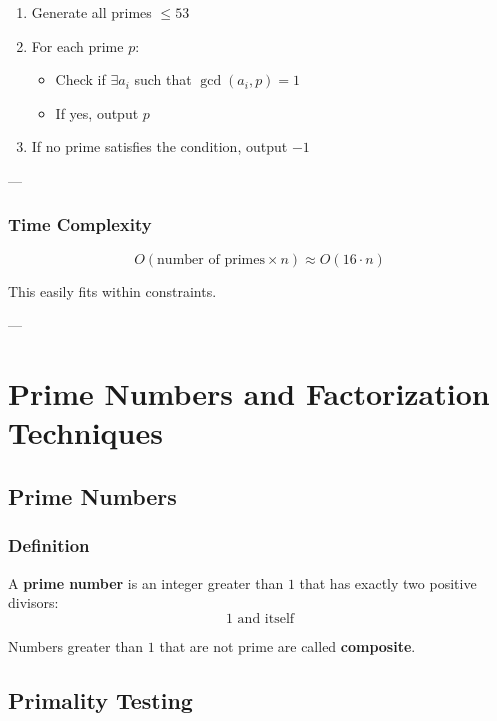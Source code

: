 \documentclass[11pt]{article}
\begin{document}
\begin{enumerate}
    \item Generate all primes $\le 53$
    \item For each prime $p$:
    \begin{itemize}
        \item Check if $\exists a_i$ such that $\gcd(a_i, p) = 1$
        \item If yes, output $p$
    \end{itemize}
    \item If no prime satisfies the condition, output $-1$
\end{enumerate}

---

\subsubsection{Time Complexity}

\[
O(\text{number of primes} \times n) \approx O(16 \cdot n)
\]

This easily fits within constraints.

---

\section{Prime Numbers and Factorization Techniques}

\subsection{Prime Numbers}

\subsubsection{Definition}
A \textbf{prime number} is an integer greater than $1$ that has exactly two
positive divisors:
\[
1 \text{ and itself}
\]

Numbers greater than $1$ that are not prime are called \textbf{composite}.


\subsection{Primality Testing}
\end{document}
